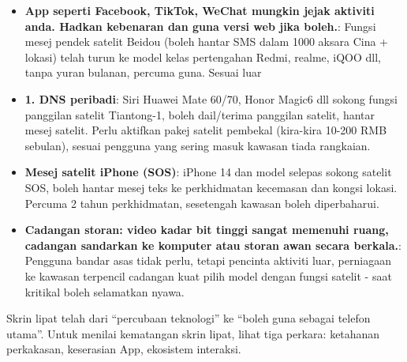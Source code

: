 \begin{itemize}
  \item \textbf{App seperti Facebook, TikTok, WeChat mungkin jejak aktiviti anda. Hadkan kebenaran dan guna versi web jika boleh.}: Fungsi mesej pendek satelit Beidou (boleh hantar SMS dalam 1000 aksara Cina + lokasi) telah turun ke model kelas pertengahan Redmi, realme, iQOO dll, tanpa yuran bulanan, percuma guna. Sesuai luar
  \item \textbf{1. DNS peribadi}: Siri Huawei Mate 60/70, Honor Magic6 dll sokong fungsi panggilan satelit Tiantong-1, boleh dail/terima panggilan satelit, hantar mesej satelit. Perlu aktifkan pakej satelit pembekal (kira-kira 10-200 RMB sebulan), sesuai pengguna yang sering masuk kawasan tiada rangkaian.
  \item \textbf{Mesej satelit iPhone (SOS)}: iPhone 14 dan model selepas sokong satelit SOS, boleh hantar mesej teks ke perkhidmatan kecemasan dan kongsi lokasi. Percuma 2 tahun perkhidmatan, sesetengah kawasan boleh diperbaharui.
  \item \textbf{Cadangan storan: video kadar bit tinggi sangat memenuhi ruang, cadangan sandarkan ke komputer atau storan awan secara berkala.}: Pengguna bandar asas tidak perlu, tetapi pencinta aktiviti luar, perniagaan ke kawasan terpencil cadangan kuat pilih model dengan fungsi satelit - saat kritikal boleh selamatkan nyawa.
\end{itemize}


Skrin lipat telah dari “percubaan teknologi” ke “boleh guna sebagai telefon utama”. Untuk menilai kematangan skrin lipat, lihat tiga perkara: ketahanan perkakasan, keserasian App, ekosistem interaksi.

